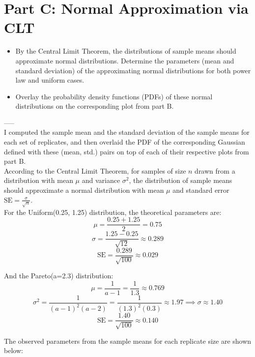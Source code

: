 \section{Part C: Normal Approximation via CLT}
\begin{itemize}
    \item By the Central Limit Theorem, the distributions of sample means should approximate normal distributions. Determine the parameters (mean and standard deviation) of the approximating normal distributions for both power law and uniform cases.
    \item Overlay the probability density functions (PDFs) of these normal distributions on the corresponding plot from part B.
\end{itemize}
-----\\

I computed the sample mean and the standard deviation of the sample means for each set of replicates, and then overlaid the PDF of the corresponding Gaussian defined with these (mean, std.) pairs on top of each of their respective plots from part B.\\

According to the Central Limit Theorem, for samples of size $n$ drawn from a distribution with mean $\mu$ and variance $\sigma^2$, the distribution of sample means should approximate a normal distribution with mean $\mu$ and standard error $\text{SE} = \frac{\sigma}{\sqrt{n}}$.\\

For the Uniform(0.25, 1.25) distribution, the theoretical parameters are:
$$\mu = \frac{0.25 + 1.25}{2} = 0.75$$
$$\sigma = \frac{1.25 - 0.25}{\sqrt{12}} \approx 0.289$$
$$\text{SE} = \frac{0.289}{\sqrt{100}} \approx 0.029$$

And the Pareto(a=2.3) distribution:
$$\mu = \frac{1}{a-1} = \frac{1}{1.3} \approx 0.769$$
$$\sigma^2 = \frac{1}{(a-1)^2(a-2)} = \frac{1}{(1.3)^2(0.3)} \approx 1.97 \implies \sigma \approx 1.40$$
$$\text{SE} = \frac{1.40}{\sqrt{100}} \approx 0.140$$

The observed parameters from the sample means for each replicate size are shown below:

